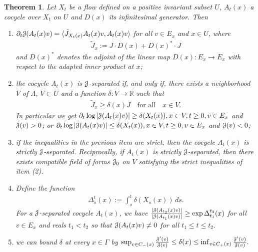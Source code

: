 \documentclass[12pt,reqno]{amsart}
\numberwithin{equation}{section}
\theoremstyle{plain}
\newtheorem{theorem}{Theorem}[section]
\theoremstyle{definition}
\newcommand{\RR}{{\mathbb R}}
\newcommand{\J}{\EuScript{J}}
\begin{document}
\begin{theorem}
  \label{thm:J-separated-tildeJ}
  Let $X_t$ be a flow defined on a positive invariant subset
  $U$, $A_t(x)$ a cocycle over $X_t$ on $U$ and $D(x)$ its
  infinitesimal generator. Then
  \begin{enumerate}
  \item $\partial_t \J(A_t(x)v) = \langle \tilde J_{X_t(x)}
    A_t(x)v,A_t(x)v\rangle$ for all $v\in E_x$ and $x\in U$,
    where
    \begin{align}\label{eq:J-separated-tildeJ}
      \tilde J_x:= J\cdot D(x) + D(x)^* \cdot J
    \end{align}
    and $D(x)^*$ denotes the adjoint of the linear map
    $D(x):E_x\to E_x$ with respect to the adapted inner
    product at $x$;
  \item the cocycle $A_t(x)$ is $\J$-separated if, and only
    if, there exists a neighborhood $V$ of $\Lambda$,
$V\subset U$ and a function $\delta:V\to\RR$ such that
    \begin{align}\label{eq:J-ge}
      \tilde J_x\ge\delta(x) J
      \quad\text{for all}\quad x\in V.
    \end{align}
    In particular we get 
  $\partial_t\log|\J(A_t(x)v)|\ge\delta(X_t(x)), x\in V,
  t\ge0, v\in E_x$ and $\J(v)>0$; or
  $\partial_t\log|\J(A_t(x)v)|\le\delta(X_t(x)), x\in V,
  t\ge0, v\in E_x$ and $\J(v)<0$;
  \item if the inequalities in the previous item are strict,
    then the cocycle $A_t(x)$ is strictly
    $\J$-separated. Reciprocally, if $A_t(x)$ is strictly
    $\J$-separated, then there exists compatible field
    of forms $\J_0$ on $V$ satisfying the strict
    inequalities of item (2).
  \item Define the function
    \begin{align}\label{eq:delta-area}
     \Delta_s^t(x):=\int_s^t\delta(X_s(x))\,ds.
    \end{align}
    For a $\J$-separated cocycle $A_t(x)$, we have
    $\frac{|\J(A_{t_2}(x)v)|}{|\J(A_{t_1}(x)v)|}\ge \exp
    \Delta_{t_1}^{t_2}(x)$ for all $v\in E_x$ and reals
    $t_1<t_2$ so that $\J(A_t(x)v)\neq0$ for all $t_1\le
    t\le t_2$.
\item  we can bound $\delta$ at every $x\in\Gamma$
  by $ \sup_{v\in C_-(x)}\frac{\J'(v)}{\J(v)}
  \le\delta(x)\le \inf_{v\in
    C_+(x)}\frac{\J'(v)}{\J(v)}.$
  \end{enumerate}
\end{theorem}
\end{document}
